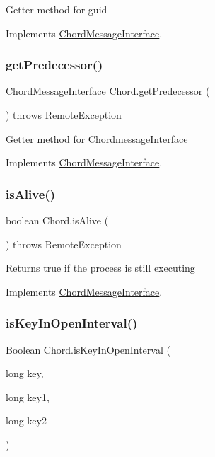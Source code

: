 Getter method for guid 

Implements \mbox{\hyperlink{interface_chord_message_interface}{Chord\+Message\+Interface}}.

\mbox{\label{class_chord_a3f1aadce3820e808c80662bb61a58e34}} 
\subsubsection{\texorpdfstring{get\+Predecessor()}{getPredecessor()}}
{\footnotesize\ttfamily \mbox{\hyperlink{interface_chord_message_interface}{Chord\+Message\+Interface}} Chord.\+get\+Predecessor (\begin{DoxyParamCaption}{ }\end{DoxyParamCaption}) throws Remote\+Exception\hspace{0.3cm}{\ttfamily [inline]}}

Getter method for Chordmessage\+Interface 

Implements \mbox{\hyperlink{interface_chord_message_interface}{Chord\+Message\+Interface}}.

\mbox{\label{class_chord_a0a677ced19cc0cb5afd2a695977aeb95}} 
\subsubsection{\texorpdfstring{is\+Alive()}{isAlive()}}
{\footnotesize\ttfamily boolean Chord.\+is\+Alive (\begin{DoxyParamCaption}{ }\end{DoxyParamCaption}) throws Remote\+Exception\hspace{0.3cm}{\ttfamily [inline]}}

Returns true if the process is still executing 

Implements \mbox{\hyperlink{interface_chord_message_interface}{Chord\+Message\+Interface}}.

\mbox{\label{class_chord_a68c9c3d06da58a6a32aa536751d6a221}} 
\subsubsection{\texorpdfstring{is\+Key\+In\+Open\+Interval()}{isKeyInOpenInterval()}}
{\footnotesize\ttfamily Boolean Chord.\+is\+Key\+In\+Open\+Interval (\begin{DoxyParamCaption}\item[{long}]{key,  }\item[{long}]{key1,  }\item[{long}]{key2 }\end{DoxyParamCaption})\hspace{0.3cm}{\ttfamily [inline]}}

